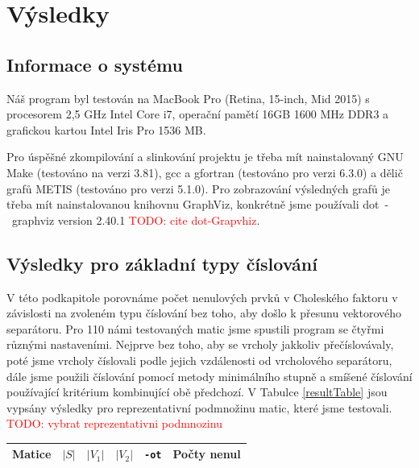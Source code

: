 \documentclass[11pt,american,czech,oneside]{book}
\theoremstyle{plain}
\theoremstyle{definition}
\newcommand{\TODO}[1]{\textcolor{red}{TODO: #1}}
\begin{document}
\chapter{Výsledky}

\section{Informace o systému}
Náš program byl testován na MacBook Pro (Retina, 15-inch, Mid 2015) s procesorem 2,5 GHz Intel Core i7, operační pamětí 16GB 1600 MHz DDR3 a grafickou kartou Intel Iris Pro 1536 MB.

Pro úspěšné zkompilování a slinkování projektu je třeba mít nainstalovaný GNU Make (testováno na verzi 3.81), gcc a gfortran (testováno pro verzi 6.3.0) a dělič grafů METIS (testováno pro verzi 5.1.0). Pro zobrazování výsledných grafů je třeba mít nainstalovanou knihovnu GraphViz, konkrétně jsme používali dot~-~graphviz version 2.40.1 \TODO{cite dot-Grapvhiz}.

\section{Výsledky pro základní typy číslování}
V této podkapitole porovnáme počet nenulových prvků v Choleského faktoru v závislosti na zvoleném typu číslování bez toho, aby došlo k přesunu vektorového separátoru. Pro 110 námi testovaných matic jsme spustili program se čtyřmi různými nastaveními. Nejprve bez toho, aby se vrcholy jakkoliv přečíslovávaly, poté jsme vrcholy číslovali podle jejich vzdálenosti od vrcholového separátoru, dále jsme použili číslování pomocí metody minimálního stupně a smíšené číslování používající kritérium kombinující obě předchozí. V Tabulce \ref{resultTable} jsou vypsány výsledky pro reprezentativní podmnožinu matic, které jsme testovali. 
\TODO{vybrat reprezentativni podmnozinu}

\bigskip
{\noindent
\footnotesize
  \centering
  \renewcommand{\arraystretch}{1.15}
\begin{longtable}{|l|c|c|c|r|r|r|}
  \hline
  \multicolumn{1}{|c|}{Matice} & \multicolumn{1}{|c|}{$|S|$}    &\multicolumn{1}{|c|}{$|V_1|$} &\multicolumn{1}{|c|}{$|V_2|$} & \multicolumn{1}{|c|}{\texttt{-ot}} & \multicolumn{2}{c|}{Počty nenul} \\
  \hline
  
  \hline
\end{longtable}
\captionof{table}{\TODO{dopsat} \label{resultTable}}
}
\end{document}
